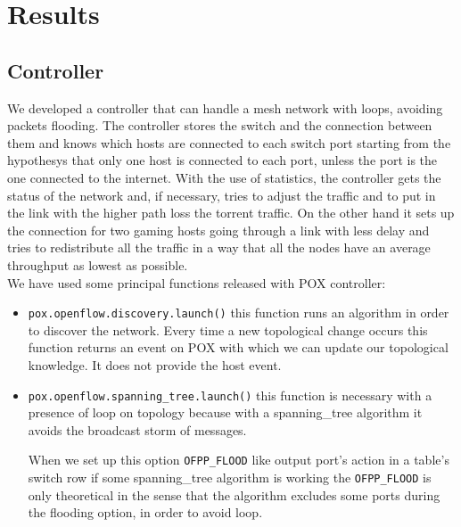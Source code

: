 \documentclass[article,10pt]{IEEEtran}
\begin{document}
\section{Results}\label{sec:results}
\subsection{Controller}
We developed a controller that can handle a mesh network with loops, avoiding
packets flooding. The controller stores the switch and the connection between them and knows which hosts are connected to each switch port starting from the hypothesys that only one
host is connected to each port, unless the port is the one connected to the internet.
With the use of statistics, the controller gets the status of the network and, if necessary,
tries to adjust the traffic and to put in the link with the higher path loss the torrent traffic.
On the other hand it sets up the connection for two gaming hosts going through a link with less delay and tries to redistribute all the 
traffic in a way that all the nodes have an average throughput as lowest as possible.
\\
\newline
We have used some principal functions released with POX controller:
\begin{itemize}
 \item \texttt{pox.openflow.discovery.launch()} this function runs an algorithm in order to discover the network. Every time a new
 topological change occurs this function returns an event on POX with which we can update our topological knowledge.
 It does not provide the host event\cite{pox}.
 \item \texttt{pox.openflow.spanning_tree.launch()} this function is necessary with a presence of loop on topology
 because with a spanning_tree algorithm it avoids the broadcast storm of messages.
 
When we set up this option \texttt{OFPP_FLOOD} like output port's action in a table's switch row if some spanning_tree algorithm is working
the \texttt{OFPP_FLOOD} is only theoretical in the sense that the algorithm excludes some ports during the flooding option, in order to avoid loop\cite{pox}.
\end{itemize}
\end{document}
